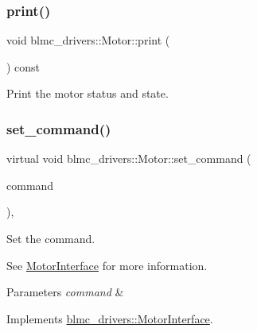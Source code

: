 \mbox{\label{classblmc__drivers_1_1Motor_a2779f53af7b066254cac47bf07a162a4}} 
\subsubsection{\texorpdfstring{print()}{print()}}
{\footnotesize\ttfamily void blmc\+\_\+drivers\+::\+Motor\+::print (\begin{DoxyParamCaption}{ }\end{DoxyParamCaption}) const\hspace{0.3cm}{\ttfamily [virtual]}}



Print the motor status and state. 

\mbox{\label{classblmc__drivers_1_1Motor_a4af56df5466d011fc2a567dd815a6c1b}} 
\subsubsection{\texorpdfstring{set\+\_\+command()}{set\_command()}}
{\footnotesize\ttfamily virtual void blmc\+\_\+drivers\+::\+Motor\+::set\+\_\+command (\begin{DoxyParamCaption}\item[{const \hyperlink{classblmc__drivers_1_1MotorBoardCommand}{Motor\+Board\+Command} \&}]{command }\end{DoxyParamCaption})\hspace{0.3cm}{\ttfamily [inline]}, {\ttfamily [virtual]}}



Set the command. 

See \hyperlink{classblmc__drivers_1_1MotorInterface}{Motor\+Interface} for more information.


\begin{DoxyParams}{Parameters}
{\em command} & \\
\hline
\end{DoxyParams}


Implements \hyperlink{classblmc__drivers_1_1MotorInterface_a723a772b2be5beb0f07097a5b3e00a89}{blmc\+\_\+drivers\+::\+Motor\+Interface}.

